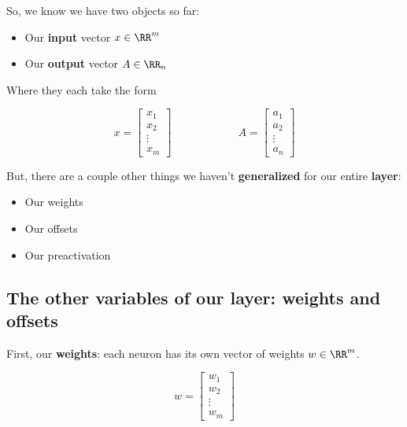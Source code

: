         So, we know we have two objects so far:
        
        \begin{itemize}
            \item Our \textbf{input} vector $x \in \RR^m$
            
            \item Our \textbf{output} vector $A \in \RR_n$

        \end{itemize}
        
        Where they each take the form
        
        \begin{equation}
            x = 
                \begin{bmatrix}
                  x_1\\x_2\\ \vdots \\ x_m
                \end{bmatrix}
            \qquad \qquad \qquad
            A =
            \begin{bmatrix}
                a_1\\a_2\\ \vdots \\ a_n
            \end{bmatrix}
        \end{equation}
        
        But, there are a couple other things we haven't \textbf{generalized} for our entire \textbf{layer}:
        
        \begin{itemize}
            \item Our weights 
            \item Our offsets
            \item Our preactivation
        \end{itemize}
        
    \subsection*{The other variables of our layer: weights and offsets}
        
        First, our \textbf{weights}: each neuron has its own vector of weights $w \in \RR^m$.
            
        \begin{equation}
            w = 
            \begin{bmatrix}
              w_1\\w_2\\ \vdots \\ w_m
            \end{bmatrix}
        \end{equation}
        
